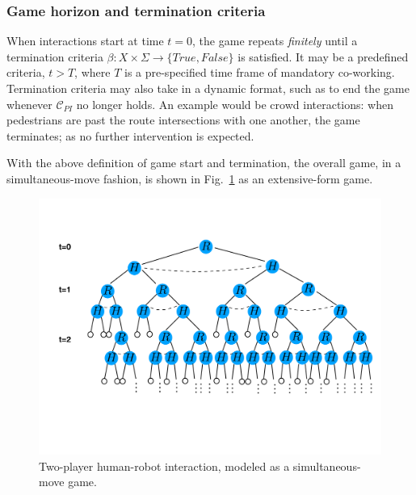 \documentclass[letterpaper, 10 pt, conference]{ieeeconf}  %
\begin{document}
\subsubsection{Game horizon and termination criteria}
When interactions start at time $t=0$, the game repeats \textit{finitely} 
until a termination criteria 
$\beta: X \times \Sigma \rightarrow \{True,False\}$ is satisfied. It may be a 
predefined criteria, $t>T$, where $T$ is a pre-specified time frame of 
mandatory co-working. Termination criteria may also take in a dynamic format, 
such as to end the game whenever $\mathcal{C}_{PI}$ no longer holds. An 
example would be crowd interactions: when pedestrians are past the route 
intersections with one another, the game terminates; as no further intervention is 
expected.

With the above definition of game start and termination, the overall game, in 
a simultaneous-move fashion, is shown in Fig.~\ref{fig:game_tree} as an extensive-form game.
   \begin{figure}[t]
      \centering
      \vspace{-3em}
      \includegraphics[scale=0.21]{game_tree}
      \vspace{-5em}
      \caption{Two-player human-robot interaction, modeled as a 
      simultaneous-move game. }
      \vspace{-1.4em}
      \label{fig:game_tree}
   \end{figure}

\vspace{-.2em}
\end{document}
